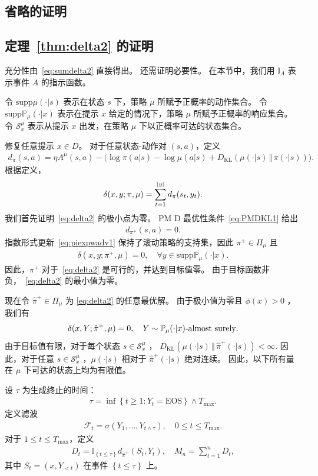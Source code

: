 \documentclass[11pt]{article}
\theoremstyle{definition}
\def\eq#1{\begin{equation*}\begin{split}#1\end{split}\end{equation*}}
\def\eql#1#2{\begin{equation}{#1}\begin{split}#2\end{split}\end{equation}}
\def\pr#1{\left( #1 \right ) }
\def\dr#1{\left\{#1\right\}}
\def\calF{\mathcal{F}}
\def\calS{\mathcal{S}}
\def\prB#1{\Big( #1 \Big)}
\def\KL#1#2{D_{\mathrm{KL}}(#1 \,\Vert\, #2)}
\newcommand\cmu{\mathbb{P}_{\mu}}
\begin{document}
\begin{appendices}

\section{省略的证明}
\subsection{定理~\ref{thm:delta2} 的证明}\label{sec:prfdelta2}
充分性由~\eqref{eq:sumdelta2} 直接得出。  
还需证明必要性。  
在本节中，我们用 $\mathbb{I}_A$ 表示事件 $A$ 的指示函数。  

令 $\text{supp}\mu(\cdot|s)$ 表示在状态 $s$ 下，策略 $\mu$ 所赋予正概率的动作集合。  
令 $\text{supp}\cmu(\cdot|x)$ 表示在提示 $x$ 给定的情况下，策略 $\mu$ 所赋予正概率的响应集合。  
令 $\calS_x^\mu$ 表示从提示 $x$ 出发，在策略 $\mu$ 下以正概率可达的状态集合。

修复任意提示 $x\in D$。
对于任意状态-动作对 $(s,a)$，定义
\eq{
    d_\pi(s,a) = \eta A^\mu(s,a) - \prB{\log\pi(a|s) - \log\mu(a|s) + \KL{\mu(\cdot|s)}{\pi(\cdot|s)}}.
}
根据定义，
\eql{\label{eq:deltasumdt}}{
    \delta(x,y;\pi,\mu) = \sum_{t=1}^{|y|} d_\pi(s_t,y_t).
}
我们首先证明~\eqref{eq:delta2} 的极小点为零。
PM D 最优性条件~\eqref{eq:PMDKL1} 给出
\eq{
    d_{\pi^+}(s,a)=0.
}
指数形式更新~\eqref{eq:piexpwadv1} 保持了滚动策略的支持集，因此 $\pi^+\in\Pi_\mu$ 且
\eq{
    \delta(x,y;\pi^+,\mu)=0,
    \quad
    \forall y\in\text{supp}\cmu(\cdot|x).
}
因此，$\pi^+$ 对于~\eqref{eq:delta2} 是可行的，并达到目标值零。
由于目标函数非负，~\eqref{eq:delta2} 的最小值为零。

现在令 $\hat{\pi}^+\in\Pi_\mu$ 为 \eqref{eq:delta2} 的任意最优解。  
由于极小值为零且 $\phi(x) > 0$ ，我们有  
\eql{\label{eq:deltapizero1}}{
    \delta(x,Y;\hat{\pi}^+,\mu)=0,
    \quad
    Y\sim\cmu(\cdot|x)\text{-almost surely}.  
}  
由于目标值有限，对于每个状态 $s\in\calS_x^\mu$ ，  
$\KL{\mu(\cdot|s)}{\hat{\pi}^+(\cdot|s)} < \infty. $  
因此，对于任意 $s\in \calS_x^{\mu}$ ，$\mu(\cdot|s)$ 相对于 $\hat{\pi}^+(\cdot|s)$ 绝对连续。  
因此，以下所有量在 $\mu$ 下可达的状态上均为有限值。  

设 $\tau$ 为生成终止的时间：  
\eq{
    \tau= \inf\dr{t\geq 1: Y_t=\mathrm{EOS}} \wedge T_{\max}.
}
定义滤波
\eq{
    \calF_t= \sigma\pr{Y_1,\dots,Y_{t\wedge\tau}}, \quad 0\leq t\leq T_{\max}.   
}
对于 $1\leq t\leq T_{\max}$，定义
\eq{
    D_t = \mathbb{I}_{\dr{t\leq\tau}}d_{\hat{\pi}^+}(S_t,Y_t), \quad
    M_n = \sum_{t=1}^n D_t,
}
其中 $S_t=(x,Y_{<t})$ 在事件 $\dr{t\leq\tau}$ 上。


\end{appendices}
\end{document}
